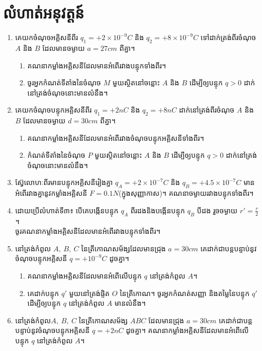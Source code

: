 \section{លំហាត់អនុវត្តន៍}
	\begin{enumerate}[m]
		\item គេយកចំណុចអគ្គិសនីពីរ $q_{1}=+2\times10^{-9}C$ និង $q_{2}=+8\times10^{-9}C$ ទៅដាក់ត្រង់ពីរចំណុច $A$ និង $B$ ដែលមានចម្ងាយ $a=27cm$ ពីគ្នា។
		\begin{enumerate}[k]
			\item គណនាកម្លាំងអគ្គិសនីដែលមានអំពើរវាងបន្ទុកទាំងពីរ។
			\item ចូរអ្នកកំណត់ទីតាំងនៃចំណុច $M$ មួយស្ថិតនៅចន្លោះ $A$ និង $B$ ដើម្បីឲ្យបន្ទុក $q>0$ ដាក់នៅត្រង់ចំណុចនោះមានលំនឹង។
		\end{enumerate}
		\item គេយកចំណុចបន្ទុកអគ្គិសនីពីរ $q_{1}=+2nC$ និង $q_{2}=+8nC$ ដាក់នៅត្រង់ពីរចំណុច $A$ និង $B$ ដែលមានចម្ងាយ $d=30cm$ ពីគ្នា។
		\begin{enumerate}[k]
			\item គណនាកម្លាំងអគ្គិសនីដែលមានអំពើរវាងចំណុចបន្ទុកអគ្គិសនីទាំងពីរ។
			\item កំណត់ទីតាំងនៃចំណុច $P$ មួយស្ថិតនៅចន្លោះ $A$ និង $B$ ដើម្បីឲ្យបន្ទុក $q>0$ ដាក់នៅត្រង់ចំណុចនោះមានលំនឹង។
		\end{enumerate} 
		\newpage
		\item ស៊្វែលោហៈពីរមានបន្ទុកអគ្គិសនីរៀងគ្នា $q_{A}=+2\times10^{-7}C$ និង $q_{B}=+4.5\times10^{-7}C$ មានអំពើរវាងគ្នានូវកម្លាំងអគ្គិសនី $F=0.1N$(ក្នុងសុញ្ញាកាស)។ គណនាចម្ងាយរវាងបន្ទុកទាំងពីរ។
		\item ដោយប្រើលំហាត់ទី៣៖ បើគេបង្កើនបន្ទុក $q_{A}$ ពីរដងនិងបង្កើនបន្ទុក $q_{B}$ បីដង រួចចម្ងាយ $r'=\frac{r}{2}$។\\ ចូរគណនាកម្លាំងអគ្គិសនីដែលមានអំពើរវាងបន្ទុកទាំងពីរ។
		\item នៅត្រង់កំពូល $A,~B,~C$ នៃត្រីកោណសម័ង្សដែលមានជ្រុង $a=30cm$ គេដាក់ជាបន្តបន្ទាប់នូវចំណុចបន្ទុកអគ្គិសនី $q=+10^{-9}C$ ដូចគ្នា។
		\begin{enumerate}[k]
			\item គណនាកម្លាំងអគ្គិសនីដែលមានអំពើលើបន្ទុក $q$ នៅត្រង់កំពូល $A$។
			\item គេដាក់បន្ទុក $q'$ មួយនៅត្រង់ផ្ចិត $O$ នៃត្រីកោណ។ ចូរអ្នកកំណត់សញ្ញា និងតម្លៃនៃបន្ទុក $q'$ ដើម្បីឲ្យបន្ទុក $q$ នៅត្រង់កំពូល $A$ មានលំនឹង។
		\end{enumerate}
		\item នៅត្រង់កំពូល​ $A,~B,~C$ នៃត្រីកោណសម័ង្ស $ABC$ ដែលមានជ្រុង $a=30cm$ គេដាក់ជាបន្តបន្ទាប់នូវចំណុចបន្ទុកអគ្គិសនី $q=+2nC$ ដូចគ្នា។ គណនាកម្លាំងអគ្គិសនីដែលមានអំពើលើបន្ទុក $q$ នៅត្រង់កំពូល $A$។

\end{enumerate}
